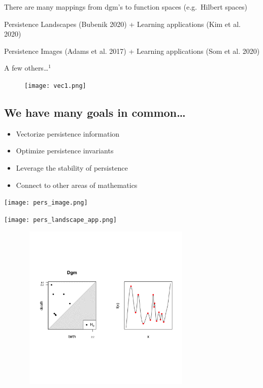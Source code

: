 \documentclass[
  letterpaper,
  DIV=11,
  numbers=noendperiod,
  oneside]{scrartcl}
\providecommand{\tightlist}{%
  \setlength{\itemsep}{0pt}\setlength{\parskip}{0pt}}\usepackage{longtable,booktabs,array}
\begin{document}
There are many mappings from \(\mathrm{dgm}\)'s to function spaces
(e.g.~Hilbert spaces)

Persistence Landscapes (Bubenik 2020) + Learning applications (Kim et
al. 2020)

Persistence Images (Adams et al. 2017) + Learning applications (Som et
al. 2020)

A few others\ldots{}\(^1\)

\begin{figure}

{\centering \texttt{[image: vec1.png]}

}

\end{figure}


\hypertarget{we-have-many-goals-in-common}{%
\subsection{We have many goals in
common\ldots{}}\label{we-have-many-goals-in-common}}

\begin{itemize}
\tightlist
\item
  Vectorize persistence information
\end{itemize}

\begin{itemize}
\tightlist
\item
  Optimize persistence invariants
\end{itemize}

\begin{itemize}
\tightlist
\item
  Leverage the stability of persistence
\end{itemize}

\begin{itemize}
\tightlist
\item
  Connect to other areas of mathematics
\end{itemize}

\texttt{[image: pers\_image.png]}

\texttt{[image: pers\_landscape\_app.png]}

\includegraphics[width=4.16667in,height=3.125in]{stability.gif}
\end{document}
